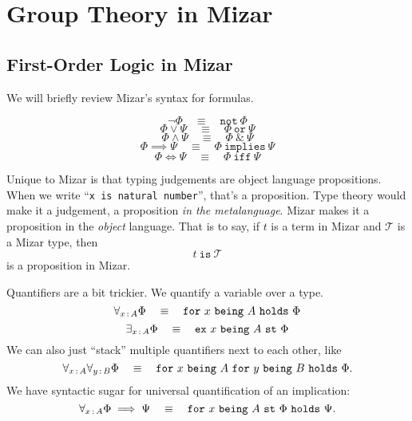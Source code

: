 \chapter{Group Theory in Mizar}

\section{First-Order Logic in Mizar}

We will briefly review Mizar's syntax for formulas.

\begin{equation}
  \neg\Phi\quad\equiv\quad\mathtt{not}~\Phi
\end{equation}
\begin{equation}
  \Phi\lor\Psi\quad\equiv\quad\Phi~\mathtt{or}~\Psi
\end{equation}
\begin{equation}
  \Phi\land\Psi\quad\equiv\quad\Phi~\mathtt{\&}~\Psi
\end{equation}
\begin{equation}
  \Phi\implies\Psi\quad\equiv\quad\Phi~\mathtt{implies}~\Psi
\end{equation}
\begin{equation}
  \Phi\iff\Psi\quad\equiv\quad\Phi~\mathtt{iff}~\Psi
\end{equation}

Unique to Mizar is that typing judgements are object language
propositions. When we write ``\texttt{x is natural number}'', that's a
proposition. Type theory would make it a judgement, a proposition
\emph{in the metalanguage}. Mizar makes it a proposition in the
\emph{object} language. That is to say, if $t$ is a term in Mizar and
$\mathcal{T}$ is a Mizar type, then
\begin{equation}
  t~\mathtt{is}~\mathcal{T}
\end{equation}
is a proposition in Mizar.

Quantifiers are a bit trickier. We quantify a variable over a type.
\begin{equation}
\forall_{x\mathop{:}\nolimits A}\Phi\quad\equiv\quad\mathtt{for}~x~\mathtt{being}~A~\mathtt{holds}~\Phi
\end{equation}
\begin{equation}
\exists_{x\mathop{:}\nolimits A}\Phi\quad\equiv\quad\mathtt{ex}~x~\mathtt{being}~A~\mathtt{st}~\Phi
\end{equation}
We can also just ``stack'' multiple quantifiers next to each other, like
\begin{equation}
\forall_{x\mathop{:}\nolimits A}\forall_{y\mathop{:}\nolimits B}\Phi\quad\equiv\quad\mathtt{for}~x~\mathtt{being}~A~\mathtt{for}~y~\mathtt{being}~B~\mathtt{holds}~\Phi.
\end{equation}
We have syntactic sugar for universal quantification of an implication:
\begin{equation}
\forall_{x\mathop{:}\nolimits A}\Phi\implies\Psi\quad\equiv\quad\mathtt{for}~x~\mathtt{being}~A~\mathtt{st}~\Phi~\mathtt{holds}~\Psi.
\end{equation}

